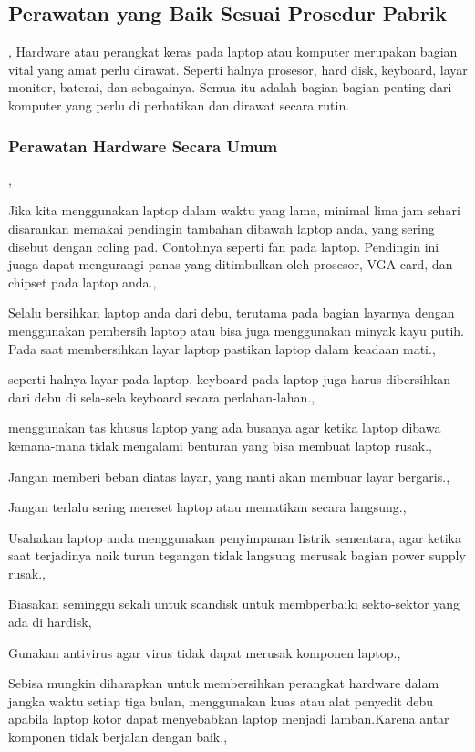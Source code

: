 \subsection{Perawatan yang Baik Sesuai Prosedur Pabrik},
Hardware atau perangkat keras pada laptop atau komputer merupakan bagian vital yang amat perlu dirawat. 
Seperti halnya prosesor, hard disk, keyboard, layar monitor, baterai, dan sebagainya. 
Semua itu adalah bagian-bagian penting dari komputer yang perlu di perhatikan dan dirawat secara rutin.

\subsubsection{Perawatan Hardware Secara Umum},
	\item{Jika kita menggunakan laptop dalam waktu yang lama, minimal lima jam sehari disarankan memakai pendingin tambahan dibawah 
	laptop anda, yang sering disebut dengan coling pad. Contohnya seperti fan pada laptop. Pendingin ini juaga dapat mengurangi panas 
	yang ditimbulkan oleh prosesor, VGA card, dan chipset pada laptop anda.},
	\item{Selalu bersihkan laptop anda dari debu, terutama pada bagian layarnya dengan menggunakan pembersih laptop atau bisa juga
	menggunakan minyak kayu putih. Pada saat membersihkan layar laptop pastikan laptop dalam keadaan mati.},
	\item{seperti halnya layar pada laptop, keyboard pada laptop juga harus dibersihkan dari debu di sela-sela keyboard secara 
	perlahan-lahan.},
	\item{menggunakan tas khusus laptop yang ada busanya agar ketika laptop dibawa kemana-mana tidak mengalami benturan yang bisa
	membuat laptop rusak.},
	\item{Jangan memberi beban diatas layar, yang nanti akan membuar layar bergaris.},
	\item{Jangan terlalu sering mereset laptop atau mematikan secara langsung.},
	\item{Usahakan laptop anda menggunakan penyimpanan listrik sementara, agar ketika saat terjadinya naik turun tegangan tidak
	langsung merusak bagian power supply rusak.},
	\item{Biasakan seminggu sekali untuk scandisk untuk membperbaiki sekto-sektor yang ada di hardisk},
	\item{Gunakan antivirus agar virus tidak dapat merusak komponen laptop.},
	\item{Sebisa mungkin diharapkan untuk membersihkan perangkat hardware dalam jangka waktu setiap tiga bulan, menggunakan kuas atau
	alat penyedit debu apabila laptop kotor dapat menyebabkan laptop menjadi lamban.Karena antar komponen tidak berjalan dengan
	baik.},

